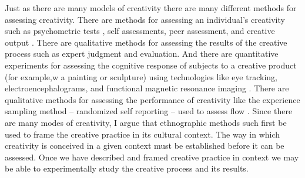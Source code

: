 \documentclass{article}
\begin{document}
Just as there are many models of creativity
there are many different methods for assessing creativity. 
%
There are methods for assessing an individual's creativity 
such as psychometric tests \citep{Drago2014}, 
self assessments, peer assessment, and creative output \citep{Csikszentmihalyi2014}. 
%
There are qualitative methods for assessing the results of the creative process 
such as expert judgment and evaluation. 
And there are quantitative experiments for assessing the cognitive response of subjects to a creative product 
(for example,w a painting or sculpture) 
using technologies like eye tracking, electroencephalograms, and functional magnetic resonance imaging
\citep{Chatterjee2014}.
%
There are qualitative methods for assessing the performance of creativity like
the experience sampling method -- randomized self reporting -- used to assess flow \citep{Csikszentmihalyi2014a}.
%
Since there are many modes of creativity, 
I argue that ethnographic methods such first be used to frame the creative practice
in its cultural context. 
The way in which creativity is conceived in a given context must be established before it can be assessed.
%
Once we have described and framed creative practice in context
we may be able to experimentally study the creative process and its results. 









 
\end{document}
